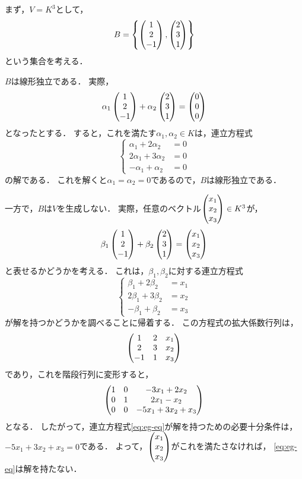 \begin{example}
    まず，$V=K^3$として，
    \[
        B = \left\{ \begin{pmatrix} 1 \\ 2 \\ -1 \end{pmatrix}, \begin{pmatrix} 2 \\ 3 \\ 1 \end{pmatrix} \right\}
    \]
    という集合を考える．
    
    $B$は線形独立である．
    実際，
    \[
        \alpha_1 \begin{pmatrix} 1 \\ 2 \\ -1 \end{pmatrix} + \alpha_2 \begin{pmatrix} 2 \\ 3 \\ 1 \end{pmatrix} = \begin{pmatrix} 0 \\ 0 \\ 0 \end{pmatrix}
    \]
    となったとする．
    すると，これを満たす$\alpha_1,\alpha_2 \in K$は，連立方程式
    \[
        \left\{
            \begin{array}{ll}
                 \alpha_1 + 2\alpha_2 &= 0  \\
                 2\alpha_1 + 3\alpha_2 &= 0 \\
                 -\alpha_1 + \alpha_2 &= 0
            \end{array}
        \right.
    \]
    の解である．
    これを解くと$\alpha_1 = \alpha_2 = 0$であるので，$B$は線形独立である．
    
    一方で，$B$は$V$を生成しない．
    実際，任意のベクトル$\begin{pmatrix} x_1\\x_2\\x_3 \end{pmatrix} \in K^3$が，
    \[
        \beta_1 \begin{pmatrix} 1 \\ 2 \\ -1 \end{pmatrix} + \beta_2 \begin{pmatrix} 2 \\ 3 \\ 1 \end{pmatrix} = \begin{pmatrix} x_1 \\ x_2 \\ x_3 \end{pmatrix}
    \]
    と表せるかどうかを考える．
    これは，$\beta_1,\beta_2$に対する連立方程式
    \begin{equation}\label{eq:eg-eq}
        \left\{
            \begin{array}{ll}
                 \beta_1 + 2\beta_2 &= x_1  \\
                 2\beta_1 + 3\beta_2 &= x_2 \\
                 -\beta_1 + \beta_2 &= x_3
            \end{array}
        \right.
    \end{equation}
    が解を持つかどうかを調べることに帰着する．
    この方程式の拡大係数行列は，
    \[
        \begin{pmatrix} 1 & 2 & x_1 \\ 2 & 3 & x_2 \\ -1 & 1 & x_3 \end{pmatrix}
    \]
    であり，これを階段行列に変形すると，
    \[
        \begin{pmatrix} 1 & 0 & -3x_1 + 2x_2 \\ 0 & 1 & 2x_1 - x_2 \\ 0 & 0 & -5x_1 + 3x_2 + x_3 \end{pmatrix}
    \]
    となる．
    したがって，連立方程式\eqref{eq:eg-eq}が解を持つための必要十分条件は，
    $-5x_1+3x_2+x_3=0$である．
    よって，$\begin{pmatrix} x_1 \\ x_2 \\ x_3 \end{pmatrix}$がこれを満たさなければ，
    \eqref{eq:eg-eq}は解を持たない．
\end{example}
